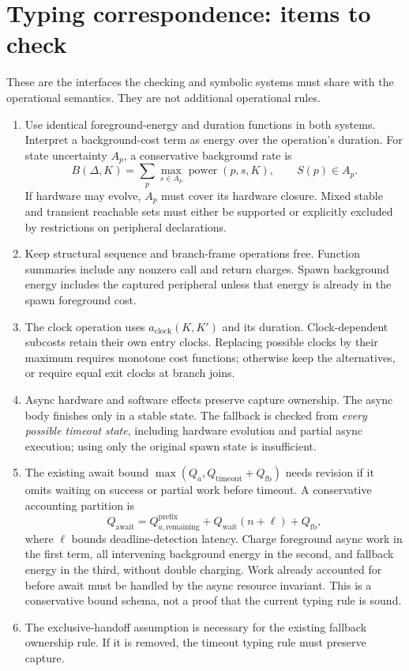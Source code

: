 \documentclass[11pt]{article}
\begin{document}
\section{Typing correspondence: items to check}
These are the interfaces the checking and symbolic systems must share with
the operational semantics. They are not additional operational rules.
\begin{enumerate}
\item Use identical foreground-energy and duration functions in both systems.
Interpret a background-cost term as energy over the operation's duration.
For state uncertainty $A_p$, a conservative background rate is
\[
 B(\Delta,K)=\sum_p\max_{s\in A_p}\operatorname{power}(p,s,K),
 \qquad S(p)\in A_p.
\]
If hardware may evolve, $A_p$ must cover its hardware closure. Mixed stable
and transient reachable sets must either be supported or explicitly excluded
by restrictions on peripheral declarations.
\item Keep structural sequence and branch-frame operations free. Function
summaries include any nonzero call and return charges. Spawn background
energy includes the captured peripheral unless that energy is already in
the spawn foreground cost.
\item The clock operation uses $a_{\mathrm{clock}}(K,K')$ and its duration.
Clock-dependent subcosts retain their own entry clocks. Replacing possible
clocks by their maximum requires monotone cost functions; otherwise keep
the alternatives, or require equal exit clocks at branch joins.
\item Async hardware and software effects preserve capture ownership. The
async body finishes only in a stable state. The fallback is checked from
\emph{every possible timeout state}, including hardware evolution and partial
async execution; using only the original spawn state is insufficient.
\item The existing await bound
$\max(Q_a,Q_{\mathrm{timeout}}+Q_{\mathrm{fb}})$ needs revision if it omits
waiting on success or partial work before timeout. A conservative accounting
partition is
\[
 Q_{\mathrm{await}}
 =Q_{a,\mathrm{remaining}}^{\mathrm{prefix}}
  +Q_{\mathrm{wait}}(n+\ell)+Q_{\mathrm{fb}},
\]
where $\ell$ bounds deadline-detection latency. Charge foreground async work
in the first term, all intervening background energy in the second, and
fallback energy in the third, without double charging. Work already accounted
for before await must be handled by the async resource invariant. This is a
conservative bound schema, not a proof that the current typing rule is sound.
\item The exclusive-handoff assumption is necessary for the existing fallback
ownership rule. If it is removed, the timeout typing rule must preserve capture.
\end{enumerate}
\end{document}
